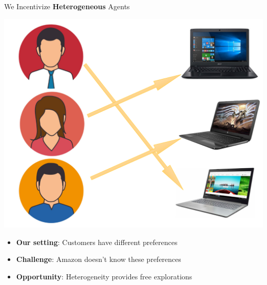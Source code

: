 \documentclass[serif]{beamer}
\begin{document}
\begin{frame}{We Incentivize \textbf{Heterogeneous} Agents}
\begin{center}
\includegraphics[scale=0.30]{example2}
\end{center}
\begin{itemize}
\item \textbf{Our setting}: Customers have different preferences
\item \textbf{Challenge}: Amazon doesn't know these preferences
\item \textbf{Opportunity}: Heterogeneity provides free explorations
\end{itemize}
\end{frame}




%

\end{document}
